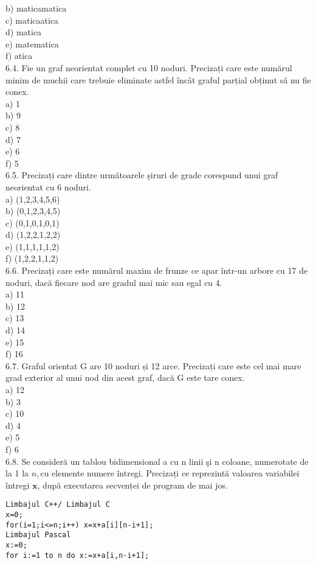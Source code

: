 b) maticamatica
\\
c) maticaatica
\\
d) matica
\\
e) matematica
\\
f) atica
\\
6.4. Fie un graf neorientat complet cu 10 noduri. Precizați care este numărul minim de muchii care trebuie eliminate astfel încât graful parțial obținut să nu fie conex.
\\
a) 1
\\
b) 9
\\
c) 8
\\
d) 7
\\
e) 6
\\
f) 5
\\
6.5. Precizați care dintre următoarele ș̦iruri de grade corespund unui graf neorientat cu 6 noduri.
\\
a) (1,2,3,4,5,6)
\\
b) (0,1,2,3,4,5)
\\
c) (0,1,0,1,0,1)
\\
d) (1,2,2,1,2,2)
\\
e) (1,1,1,1,1,2)
\\
f) (1,2,2,1,1,2)
\\
6.6. Precizați care este numărul maxim de frunze ce apar într-un arbore cu 17 de noduri, dacă fiecare nod are gradul mai mic sau egal cu 4.
\\
a) 11
\\
b) 12
\\
c) 13
\\
d) 14
\\
e) 15
\\
f) 16
\\
6.7. Graful orientat G are 10 noduri și 12 arce. Precizați care este cel mai mare grad exterior al unui nod din acest graf, dacă G este tare conex.
\\
a) 12
\\
b) 3
\\
c) 10
\\
d) 4
\\
e) 5
\\
f) 6
\\
6.8. Se consideră un tablou bidimensional a cu n linii şi n coloane, numerotate de la 1 la $n, \mathrm{cu}$ elemente numere întregi. Precizați ce reprezintă valoarea variabilei întregi $\mathbf{x}$, după executarea secvenței de program de mai jos.
\begin{verbatim}
Limbajul C++/ Limbajul C
x=0;
for(i=1;i<=n;i++) x=x+a[i][n-i+1];
Limbajul Pascal
x:=0; 
for i:=1 to n do x:=x+a[i,n-i+1];
\end{verbatim}
